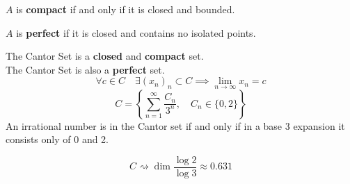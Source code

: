 \documentclass[letterpaper, 12pt]{article}
\newenvironment{definition}[1][Definition]{\begin{trivlist}
\item[\hskip \labelsep {\bfseries #1}]}{\end{trivlist}}
\newenvironment{example}[1][Example]{\begin{trivlist}
\item[\hskip \labelsep {\bfseries #1}]}{\end{trivlist}}
\newenvironment{remark}[1][Remark]{\begin{trivlist}
\item[\hskip \labelsep {\bfseries #1}]}{\end{trivlist}}
\newcommand{\keyword}[1]{\textbf{#1}}
\begin{document}
\begin{example}
\begin{enumerate}
\begin{definition}
            \end{definition}
            \begin{definition}
                $A$ is \keyword{compact} if and only if it is closed and bounded.
            \end{definition}
            \begin{definition}
                $A$ is \keyword{perfect} if it is closed and contains no isolated points.
            \end{definition}
            The Cantor Set is a \keyword{closed} and \keyword{compact} set. \\
            The Cantor Set is also a \keyword{perfect} set.
            \[\forall c \in C \quad \exists (x_n)_n \subset C \implies \lim_{n \to \infty} x_n = c\]
            \[C = \left\{\sum_{n=1}^{\infty} \frac{C_n}{3^n}, \quad C_n \in \{0, 2\}\right\}\]
            An irrational number is in the Cantor set if and only if 
            in a base 3 expansion it consists only of 0 and 2.
        \end{enumerate}
        \begin{remark}
            \[C \rightsquigarrow \dim \frac{\log 2}{\log 3} \approx 0.631\]
        \end{remark}
    \end{example}
\end{document}
